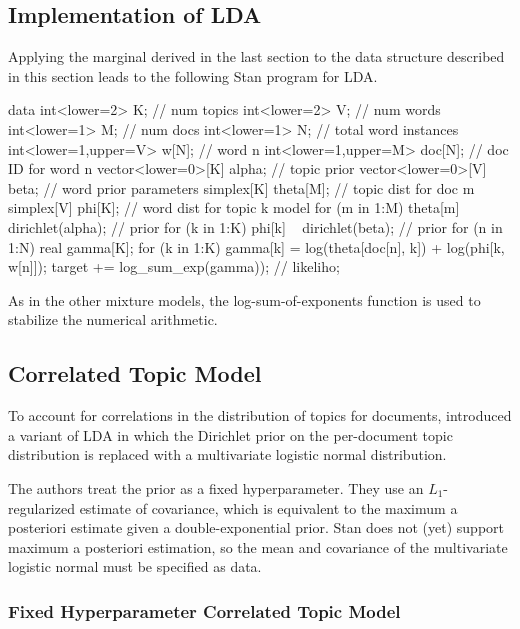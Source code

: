 \subsection{Implementation of LDA}


Applying the marginal derived in the last section to the data
structure described in this section leads to the following Stan
program for LDA.
%
\begin{stancode}
data {
  int<lower=2> K;               // num topics
  int<lower=2> V;               // num words
  int<lower=1> M;               // num docs
  int<lower=1> N;               // total word instances
  int<lower=1,upper=V> w[N];    // word n
  int<lower=1,upper=M> doc[N];  // doc ID for word n
  vector<lower=0>[K] alpha;     // topic prior
  vector<lower=0>[V] beta;      // word prior
}
parameters {
  simplex[K] theta[M];   // topic dist for doc m
  simplex[V] phi[K];     // word dist for topic k
}
model {
  for (m in 1:M)  
    theta[m] ~ dirichlet(alpha);  // prior
  for (k in 1:K)  
    phi[k] ~ dirichlet(beta);     // prior
  for (n in 1:N) {
    real gamma[K];
    for (k in 1:K) 
      gamma[k] = log(theta[doc[n], k]) + log(phi[k, w[n]]);
    target += log_sum_exp(gamma));  // likeliho;
  }
}
\end{stancode}
%
As in the other mixture models, the log-sum-of-exponents function is
used to stabilize the numerical arithmetic. 

\subsection{Correlated Topic Model}

To account for correlations in the distribution of topics for
documents, \citep{BleiLafferty:2007} introduced a variant of LDA in
which the Dirichlet prior on the per-document topic distribution is
replaced with a multivariate logistic normal distribution.  

The authors treat the prior as a fixed hyperparameter.  They use an
$L_1$-regularized estimate of covariance, which is equivalent to the
maximum a posteriori estimate given a double-exponential prior.  Stan
does not (yet) support maximum a posteriori estimation, so the mean and
covariance of the multivariate logistic normal must be specified as
data.

\subsubsection{Fixed Hyperparameter Correlated Topic Model}


